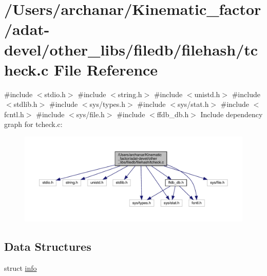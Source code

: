 \hypertarget{adat-devel_2other__libs_2filedb_2filehash_2tcheck_8c}{}\section{/\+Users/archanar/\+Kinematic\+\_\+factor/adat-\/devel/other\+\_\+libs/filedb/filehash/tcheck.c File Reference}
\label{adat-devel_2other__libs_2filedb_2filehash_2tcheck_8c}
{\ttfamily \#include $<$stdio.\+h$>$}\newline
{\ttfamily \#include $<$string.\+h$>$}\newline
{\ttfamily \#include $<$unistd.\+h$>$}\newline
{\ttfamily \#include $<$stdlib.\+h$>$}\newline
{\ttfamily \#include $<$sys/types.\+h$>$}\newline
{\ttfamily \#include $<$sys/stat.\+h$>$}\newline
{\ttfamily \#include $<$fcntl.\+h$>$}\newline
{\ttfamily \#include $<$sys/file.\+h$>$}\newline
{\ttfamily \#include $<$ffdb\+\_\+db.\+h$>$}\newline
Include dependency graph for tcheck.\+c\+:
\nopagebreak
\begin{figure}[H]
\begin{center}
\leavevmode
\includegraphics[width=350pt]{dc/dc5/adat-devel_2other__libs_2filedb_2filehash_2tcheck_8c__incl}
\end{center}
\end{figure}
\subsection*{Data Structures}
\begin{DoxyCompactItemize}
\item 
struct \mbox{\hyperlink{structinfo}{info}}
\end{DoxyCompactItemize}
